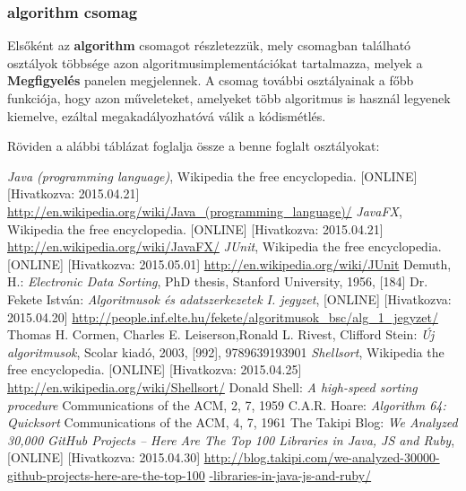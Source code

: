 \documentclass{elteikthesis}
\begin{document}
\subsubsection{algorithm csomag}
Elsőként az \textbf{algorithm} csomagot részletezzük, mely csomagban található osztályok többsége azon algoritmusimplementációkat tartalmazza, melyek a \textbf{Megfigyelés} panelen megjelennek. A csomag további osztályainak a főbb funkciója, hogy azon műveleteket, amelyeket több algoritmus is használ legyenek kiemelve, ezáltal megakadályozhatóvá válik a kódismétlés.\par
Röviden a alábbi táblázat foglalja össze a benne foglalt osztályokat:

\begin{thebibliography}{widest entry}
\emph{Java (programming language)},
Wikipedia the free encyclopedia.
[ONLINE] [Hivatkozva: 2015.04.21]
\url{http://en.wikipedia.org/wiki/Java_(programming_language)/}
\emph{JavaFX},
Wikipedia the free encyclopedia.
[ONLINE] [Hivatkozva: 2015.04.21]
\url{http://en.wikipedia.org/wiki/JavaFX/}
\emph{JUnit},
Wikipedia the free encyclopedia.
[ONLINE] [Hivatkozva: 2015.05.01]
\url{http://en.wikipedia.org/wiki/JUnit}
Demuth, H.:
\emph{Electronic Data Sorting},
PhD thesis, Stanford University,
1956, [184]
Dr. Fekete István:
\emph{Algoritmusok és adatszerkezetek I. jegyzet},
[ONLINE] [Hivatkozva: 2015.04.20] \url{http://people.inf.elte.hu/fekete/algoritmusok_bsc/alg_1_jegyzet/}
Thomas H. Cormen, Charles E. Leiserson,Ronald L. Rivest, Clifford Stein:
\emph{Új algoritmusok},
Scolar kiadó, 2003,
[992], 9789639193901
\emph{Shellsort},
Wikipedia the free encyclopedia.
[ONLINE] [Hivatkozva: 2015.04.25]
\url{http://en.wikipedia.org/wiki/Shellsort/}
Donald Shell:
\emph{A high-speed sorting procedure}
Communications of the ACM, 2, 7, 1959
C.A.R. Hoare:
\emph{Algorithm 64: Quicksort}
Communications of the ACM, 4, 7, 1961
The Takipi Blog:
\emph{We Analyzed 30,000 GitHub Projects – Here Are The Top 100 Libraries in Java, JS and Ruby},
[ONLINE] [Hivatkozva: 2015.04.30] \url{http://blog.takipi.com/we-analyzed-30000-github-projects-here-are-the-top-100}
\url{-libraries-in-java-js-and-ruby/}
\end{thebibliography}
\end{document}
